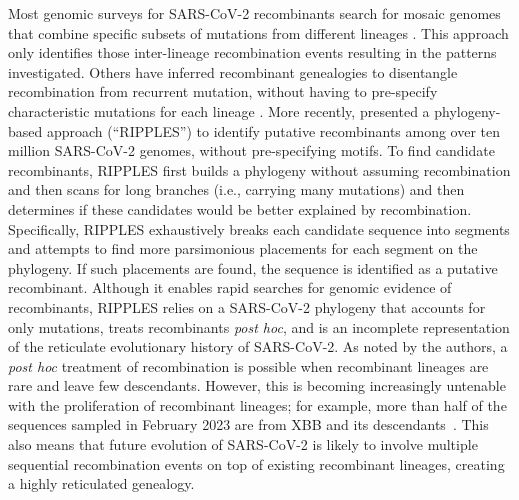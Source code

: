 \documentclass{article}
\begin{document}
Most genomic surveys for SARS-CoV-2 recombinants search for mosaic genomes that combine specific subsets of mutations from different lineages \citep[e.g.][]{VanInsberghe2021-eu,Jackson2021-ik,Wertheim2022-hj,Sekizuka2022-xz}. This approach only identifies those inter-lineage recombination events resulting in the patterns investigated. Others have inferred recombinant genealogies to disentangle recombination from recurrent mutation, without having to pre-specify characteristic mutations for each lineage \citep{Ignatieva2021-rg}. More recently, \cite{Turakhia2022-it} presented a phylogeny-based approach (``RIPPLES'') to identify putative recombinants among over ten million SARS-CoV-2 genomes, without pre-specifying motifs. To find candidate recombinants, RIPPLES first builds a phylogeny without assuming recombination and then scans for long branches (i.e., carrying many mutations) and then determines if these candidates would be better explained by recombination. Specifically, RIPPLES exhaustively breaks each candidate sequence into segments and attempts to find more parsimonious placements for each segment on the phylogeny. If such placements are found, the sequence is identified as a putative recombinant. Although it enables rapid searches for genomic evidence of recombinants, RIPPLES relies on a SARS-CoV-2 phylogeny that accounts for only mutations, treats recombinants \textit{post hoc}, and is an incomplete representation of the reticulate evolutionary history of SARS-CoV-2. As noted by the authors, a \textit{post hoc} treatment of recombination is possible when recombinant lineages are rare and leave few descendants. However, this is becoming increasingly untenable with the proliferation of recombinant lineages; for example, more than half of the sequences sampled in February 2023 are from XBB and its descendants~\citep{Chen2022-pz}. This also means that future evolution of SARS-CoV-2 is likely to involve multiple sequential recombination events on top of existing recombinant lineages, creating a highly reticulated genealogy.

\end{document}
